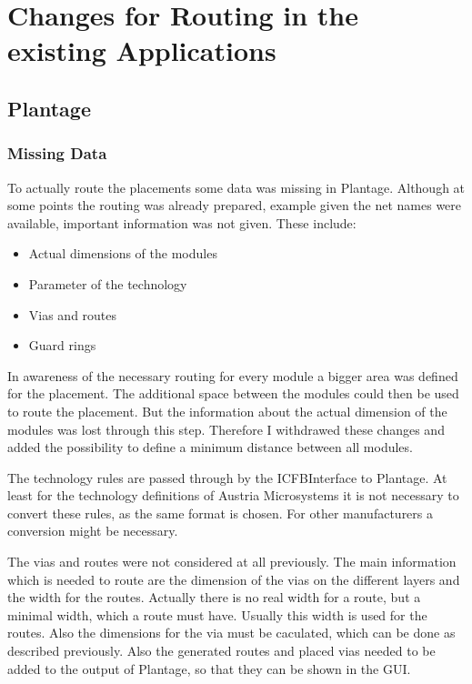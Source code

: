 \section{Changes for Routing in the existing Applications}

\subsection{Plantage}

\subsubsection{Missing Data}
To actually route the placements some data was missing in Plantage. Although at some points the routing was already prepared, example given the net names were available, important information was not given. These include:
\begin{itemize}
\item Actual dimensions of the modules
\item Parameter of the technology
\item Vias and routes
\item Guard rings
\end{itemize}

In awareness of the necessary routing for every module a bigger area was defined for the placement. The additional space between the modules could then be used to route the placement. But the information about the actual dimension of the modules was lost through this step. Therefore I withdrawed these changes and added the possibility to define a minimum distance between all modules.

The technology rules are passed through by the ICFBInterface to Plantage. At least for the technology definitions of Austria Microsystems it is not necessary to convert these rules, as the same format is chosen. For other manufacturers a conversion might be necessary.

The vias and routes were not considered at all previously. The main information which is needed to route are the dimension of the vias on the different layers and the width for the routes. Actually there is no real width for a route, but a minimal width, which a route must have. Usually this width is used for the routes. Also the dimensions for the via must be caculated, which can be done as described previously. Also the generated routes and placed vias needed to be added to the output of Plantage, so that they can be shown in the GUI.

